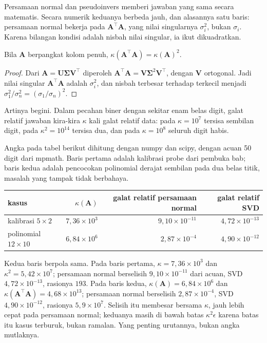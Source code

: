Persamaan normal dan pseudoinvers memberi jawaban yang sama secara matematis. Secara
numerik keduanya berbeda jauh, dan alasannya satu baris: persamaan normal bekerja pada
$\mathbf{A}^{\top}\mathbf{A}$, yang nilai singularnya $\sigma_{i}^{2}$, bukan
$\sigma_{i}$. Karena bilangan kondisi adalah nisbah nilai singular, ia ikut dikuadratkan.

\begin{akibat}
Bila $\mathbf{A}$ berpangkat kolom penuh, $\kappa(\mathbf{A}^{\top}\mathbf{A})
=\kappa(\mathbf{A})^{2}$.
\end{akibat}

\begin{proof}
Dari $\mathbf{A}=\mathbf{U}\boldsymbol{\Sigma}\mathbf{V}^{\top}$ diperoleh
$\mathbf{A}^{\top}\mathbf{A}=\mathbf{V}\boldsymbol{\Sigma}^{2}\mathbf{V}^{\top}$, dengan
$\mathbf{V}$ ortogonal. Jadi nilai singular $\mathbf{A}^{\top}\mathbf{A}$ adalah
$\sigma_{i}^{2}$, dan nisbah terbesar terhadap terkecil menjadi
$\sigma_{1}^{2}/\sigma_{n}^{2}=(\sigma_{1}/\sigma_{n})^{2}$.
\end{proof}

Artinya begini. Dalam pecahan biner dengan sekitar enam belas digit, galat relatif
jawaban kira-kira $\kappa$ kali galat relatif data: pada $\kappa=10^{7}$ tersisa sembilan
digit, pada $\kappa^{2}=10^{14}$ tersisa dua, dan pada $\kappa=10^{8}$ seluruh digit
habis.

Angka pada tabel berikut dihitung dengan numpy dan scipy, dengan acuan 50 digit dari
mpmath. Baris pertama adalah kalibrasi probe dari pembuka bab; baris kedua adalah
pencocokan polinomial derajat sembilan pada dua belas titik, masalah yang tampak tidak
berbahaya.

\begin{center}
\begin{tabular}{lrrr}
\hline
kasus & $\kappa(\mathbf{A})$ & galat relatif persamaan normal & galat relatif SVD \\
\hline
kalibrasi $5\times2$ & $7{,}36\times10^{3}$ & $9{,}10\times10^{-11}$ & $4{,}72\times10^{-13}$ \\
polinomial $12\times10$ & $6{,}84\times10^{6}$ & $2{,}87\times10^{-4}$ & $4{,}90\times10^{-12}$ \\
\hline
\end{tabular}
\end{center}

Kedua baris berpola sama. Pada baris pertama, $\kappa=7{,}36\times10^{3}$ dan
$\kappa^{2}=5{,}42\times10^{7}$; persamaan normal berselisih $9{,}10\times10^{-11}$ dari
acuan, SVD $4{,}72\times10^{-13}$, rasionya $193$. Pada baris kedua,
$\kappa(\mathbf{A})=6{,}84\times10^{6}$ dan $\kappa(\mathbf{A}^{\top}\mathbf{A})
=4{,}68\times10^{13}$; persamaan normal berselisih $2{,}87\times10^{-4}$, SVD
$4{,}90\times10^{-12}$, rasionya $5{,}9\times10^{7}$. Selisih itu membesar bersama
$\kappa$, jauh lebih cepat pada persamaan normal; keduanya masih di bawah batas
$\kappa^{2}\epsilon$ karena batas itu kasus terburuk, bukan ramalan. Yang penting
urutannya, bukan angka mutlaknya.

